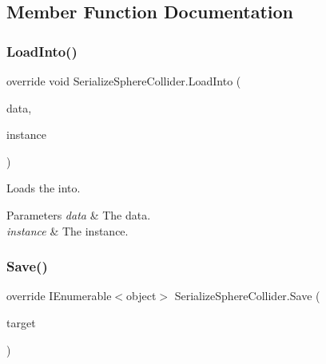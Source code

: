 \subsection{Member Function Documentation}
\mbox{\label{class_serialize_sphere_collider_ad8c33e68733624815a5963c26c62d3e4}} 
\subsubsection{\texorpdfstring{Load\+Into()}{LoadInto()}}
{\footnotesize\ttfamily override void Serialize\+Sphere\+Collider.\+Load\+Into (\begin{DoxyParamCaption}\item[{object \mbox{[}$\,$\mbox{]}}]{data,  }\item[{Sphere\+Collider}]{instance }\end{DoxyParamCaption})\hspace{0.3cm}{\ttfamily [inline]}}



Loads the into. 


\begin{DoxyParams}{Parameters}
{\em data} & The data.\\
\hline
{\em instance} & The instance.\\
\hline
\end{DoxyParams}
\mbox{\label{class_serialize_sphere_collider_ac3b7c3a6cbd6599135b7d6fbddacbf71}} 
\subsubsection{\texorpdfstring{Save()}{Save()}}
{\footnotesize\ttfamily override I\+Enumerable$<$object$>$ Serialize\+Sphere\+Collider.\+Save (\begin{DoxyParamCaption}\item[{Sphere\+Collider}]{target }\end{DoxyParamCaption})\hspace{0.3cm}{\ttfamily [inline]}}



